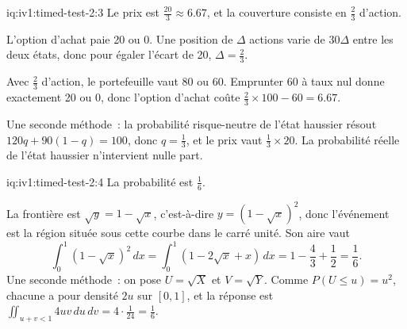 \begin{solution}{iq:iv1:timed-test-2:3}
Le prix est $\frac{20}{3} \approx 6.67$, et la couverture consiste en $\frac23$ d'action.

L'option d'achat paie 20 ou 0. Une position de $\Delta$ actions varie de $30\Delta$ entre les deux états, donc pour égaler l'écart de 20, $\Delta = \frac23$.

Avec $\frac23$ d'action, le portefeuille vaut 80 ou 60. Emprunter 60 à taux nul donne exactement 20 ou 0, donc l'option d'achat coûte $\frac23 \times 100 - 60 = 6.67$.

Une seconde méthode~: la probabilité risque-neutre de l'état haussier résout $120q + 90(1 - q) = 100$, donc $q = \frac13$, et le prix vaut $\frac13 \times 20$. La probabilité réelle de l'état haussier n'intervient nulle part.

\end{solution}

\enlargethispage{-3\baselineskip}%
\begin{solution}{iq:iv1:timed-test-2:4}
La probabilité est $\frac16$.

La frontière est $\sqrt{y} = 1 - \sqrt{x}$, c'est-à-dire $y = (1 - \sqrt{x})^2$, donc l'événement est la région située sous cette courbe dans le carré unité. Son aire vaut
\[
\int_0^1(1 - \sqrt{x})^2\,dx = \int_0^1(1 - 2\sqrt{x} + x)\,dx = 1 - \frac43 + \frac12 = \frac16.
\]
Une seconde méthode~: on pose $U = \sqrt{X}$ et $V = \sqrt{Y}$. Comme $P(U \le u) = u^2$, chacune a pour densité $2u$ sur $[0, 1]$, et la réponse est $\iint_{u + v < 1}4uv\,du\,dv = 4 \cdot \frac{1}{24} = \frac16$.

\end{solution}

